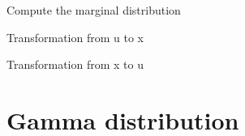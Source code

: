 \documentclass[letterpaper,10pt,english]{sphinxmanual}
\begin{document}
\begin{fulllineitems}
\begin{fulllineitems}
Compute the marginal distribution

\end{fulllineitems}



\begin{fulllineitems}
Transformation from u to x

\end{fulllineitems}



\begin{fulllineitems}
Transformation from x to u

\end{fulllineitems}


\end{fulllineitems}



\section{Gamma distribution}
\label{distributions:gamma-distribution}
\end{document}
